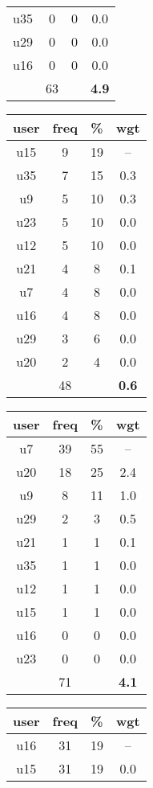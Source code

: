 \begin{appendices}
\begin{table}
\begin{tabular}{ |c|c|c|c| }
	u35 & 0 & 0 & 0.0 \\
	u29 & 0 & 0 & 0.0 \\
	u16 & 0 & 0 & 0.0 \\
	 & 63 & & \textbf{4.9} \\
	\hline
\end{tabular}
\begin{tabular}{ |c|c|c|c| }
	\hline
	\textbf{user} & \textbf{freq} & \textbf{\%} & \textbf{wgt} \\
	\hline
	u15 & 9 & 19 & -- \\
	u35 & 7 & 15 & 0.3 \\
	u9 & 5 & 10 & 0.3 \\
	u23 & 5 & 10 & 0.0 \\
	u12 & 5 & 10 & 0.0 \\
	u21 & 4 & 8 & 0.1 \\
	u7 & 4 & 8 & 0.0 \\
	u16 & 4 & 8 & 0.0 \\
	u29 & 3 & 6 & 0.0 \\
	u20 & 2 & 4 & 0.0 \\
	 & 48 & & \textbf{0.6} \\
	\hline
\end{tabular}
\begin{tabular}{ |c|c|c|c| }
	\hline
	\textbf{user} & \textbf{freq} & \textbf{\%} & \textbf{wgt} \\
	\hline
	u7 & 39 & 55 & -- \\
	u20 & 18 & 25 & 2.4 \\
	u9 & 8 & 11 & 1.0 \\
	u29 & 2 & 3 & 0.5 \\
	u21 & 1 & 1 & 0.1 \\
	u35 & 1 & 1 & 0.0 \\
	u12 & 1 & 1 & 0.0 \\
	u15 & 1 & 1 & 0.0 \\
	u16 & 0 & 0 & 0.0 \\
	u23 & 0 & 0 & 0.0 \\
	 & 71 & & \textbf{4.1} \\
	\hline
\end{tabular}
\begin{tabular}{ |c|c|c|c| }
	\hline
	\textbf{user} & \textbf{freq} & \textbf{\%} & \textbf{wgt} \\
	\hline
	u16 & 31 & 19 & -- \\
	u15 & 31 & 19 & 0.0 \\

\end{tabular}
\end{table}
\end{appendices}

